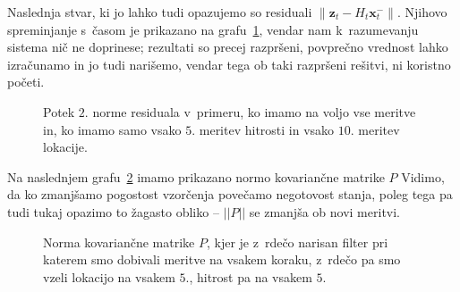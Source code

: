 \documentclass[a4paper,pdftex,10pt]{article}
\renewcommand{\vec}[1]{\boldsymbol{\mathbf{#1}}}
\numberwithin{figure}{section} %
\begin{document}
Naslednja stvar, ki jo lahko tudi opazujemo so residuali $\| \vec{z}_t - H_t \vec{x}_t^-\|$.
Njihovo spreminjanje s~časom je prikazano na grafu~\ref{slika5}, vendar nam k~razumevanju
sistema nič ne doprinese; rezultati so precej razpršeni, povprečno vrednost lahko 
izračunamo in jo tudi narišemo, vendar tega ob taki razpršeni rešitvi, ni koristno početi.
\begin{figure}[H]
    \centering
    \resizebox{.45\linewidth}{!}{}
    \caption{Potek $2.$ norme residuala v~primeru, ko imamo na voljo vse meritve in,
    ko imamo samo vsako $5.$ meritev hitrosti in vsako $10.$ meritev lokacije.}
    \label{slika5}
\end{figure}
Na naslednjem grafu~\ref{slika13} imamo prikazano normo kovariančne matrike $P$ Vidimo, da 
ko zmanjšamo pogostost vzorčenja povečamo negotovost stanja, poleg tega pa tudi tukaj 
opazimo to žagasto obliko -- $||P||$ se zmanjša ob novi meritvi. 
\begin{figure}[H]
    \centering
    \resizebox{.49\linewidth}{!}{}
    \caption{Norma kovariančne matrike $P$, kjer je z~rdečo narisan filter pri katerem smo 
    dobivali meritve na vsakem koraku, z~rdečo pa smo vzeli lokacijo na vsakem $5.$, 
    hitrost pa na vsakem $5.$}
    \label{slika13}
\end{figure}


\end{document}
